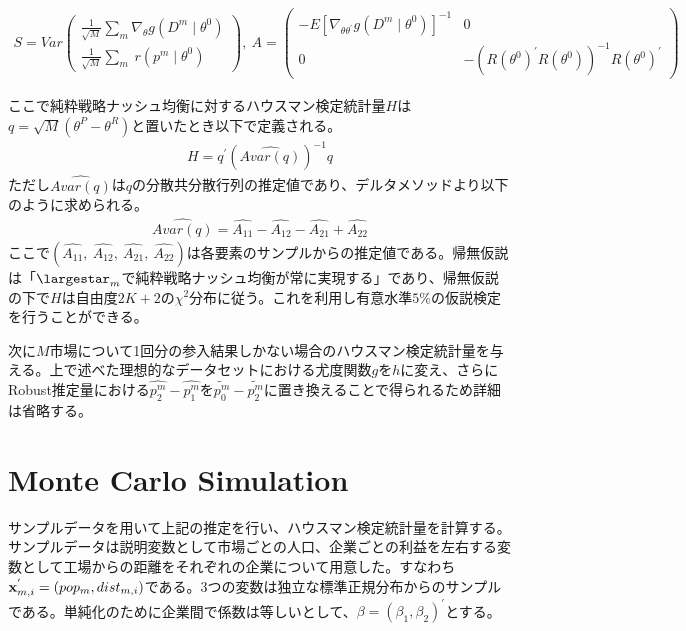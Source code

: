 \documentclass{jsarticle}
\begin{document}
\begin{align*}
	S = Var\begin{pmatrix}
	\frac{1}{\sqrt{M}} \sum_m \nabla_{\theta} g(D^m \mid \theta^0)\\[8pt]
	\frac{1}{\sqrt{M}} \sum_m\ r(p^m \mid \theta^0)
	\end{pmatrix},\ 
	A = \begin{pmatrix}
	-E\left[ \nabla_{\theta \theta^{'}}g(D^m \mid \theta^0) \right]^{-1} & 0\\[8pt]
	0 & -\left( R(\theta^0)^{'} R(\theta^0) \right)^{-1} R(\theta^0)^{'}
	\end{pmatrix}
\end{align*}

ここで純粋戦略ナッシュ均衡に対するハウスマン検定統計量$H$は$q = \sqrt{M} (\theta^P - \theta^R)$と置いたとき以下で定義される。
\begin{align*}
H = q^{'} \left( \hat{Avar\left( q \right)} \right)^{-1} q
\end{align*}
ただし$\hat{Avar\left( q \right)}$は$q$の分散共分散行列の推定値であり、デルタメソッドより以下のように求められる。
\begin{align*}
	\hat{Avar\left( q \right)} = \hat{A_{11}} - \hat{A_{12}} - \hat{A_{21}} + \hat{A_{22}} 
\end{align*}
ここで$\left(\hat{A_{11}},\ \hat{A_{12}},\ \hat{A_{21}},\ \hat{A_{22}} \right)$は各要素のサンプルからの推定値である。帰無仮説は「$\largestar_m$で純粋戦略ナッシュ均衡が常に実現する」であり、帰無仮説の下で$H$は自由度$2K + 2$の$\chi^2$分布に従う。これを利用し有意水準$5\%$の仮説検定を行うことができる。

次に$M$市場について1回分の参入結果しかない場合のハウスマン検定統計量を与える。上で述べた理想的なデータセットにおける尤度関数$g$を$h$に変え、さらにRobust推定量における$\hat{p_2^m} - \hat{p_1^m}$を$\tilde{p_0^m} - \tilde{p_2^m}$に置き換えることで得られるため詳細は省略する。

\section{Monte Carlo Simulation}
サンプルデータを用いて上記の推定を行い、ハウスマン検定統計量を計算する。サンプルデータは説明変数として市場ごとの人口、企業ごとの利益を左右する変数として工場からの距離をそれぞれの企業について用意した。すなわち${\bf x}_{m, i}^{'} = (pop_m, dist_{m, i})$である。3つの変数は独立な標準正規分布からのサンプルである。単純化のために企業間で係数は等しいとして、$\beta = (\beta_1, \beta_2)^{'}$とする。
\end{document}
